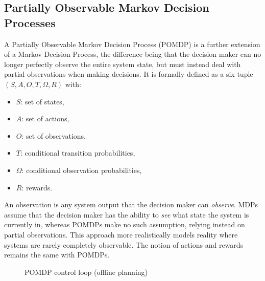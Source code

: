 \subsection{Partially Observable Markov Decision Processes}
\label{subsec:pomdp}


A Partially Observable Markov Decision Process (POMDP) is a further extension of a Markov Decision Process, the difference being that the decision maker can no longer perfectly observe the entire system state, but must instead deal with partial observations when making decisions. It is formally defined as a six-tuple $(S,A,O,T,\Omega,R)$ with:
\begin{itemize}
\item $S$: set of states,
\item $A$: set of actions,
\item $O$: set of observations,
\item $T$: conditional transition probabilities,
\item $\Omega$: conditional observation probabilities,
\item $R$: rewards.
\end{itemize}

An observation is any system output that the decision maker can \textit{observe}. MDPs assume that the decision maker has the ability to \textit{see} what state the system is currently in, whereas POMDPs make no such assumption, relying instead on partial observations. This approach more realistically models reality where systems are rarely completely observable. The notion of actions and rewards remains the same with POMDPs. 

\begin{figure}
\begin{center}
\end{center}
\caption{POMDP control loop (offline planning)}
\label{pomdpcontrolbasic}
\end{figure}


